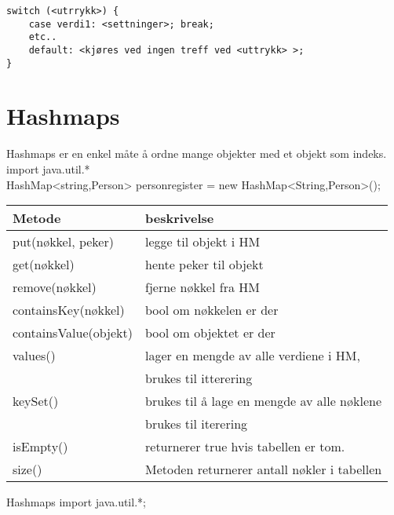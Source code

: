 \documentclass[11pt]{article}
\begin{document}
\begin{verbatim}
switch (<utrrykk>) {
    case verdi1: <settninger>; break;
    etc..
    default: <kjøres ved ingen treff ved <uttrykk> >;
}
\end{verbatim}
\section{Hashmaps}
\label{sec-6}


  Hashmaps er en enkel måte å ordne mange objekter med et objekt som
  indeks.\\
  import java.util.*\\
  HashMap<string,Person> personregister = new HashMap<String,Person>();\\
  

\begin{center}
\begin{tabular}{ll}
\hline
 Metode                 &  beskrivelse                                  \\
\hline
 put(nøkkel, peker)     &  legge til objekt i HM                        \\
\hline
 get(nøkkel)            &  hente peker til objekt                       \\
\hline
 remove(nøkkel)         &  fjerne nøkkel fra HM                         \\
\hline
 containsKey(nøkkel)    &  bool om nøkkelen er der                      \\
\hline
 containsValue(objekt)  &  bool om objektet er der                      \\
\hline
 values()               &  lager en mengde av alle verdiene i HM,       \\
                        &  brukes til itterering                        \\
\hline
 keySet()               &  brukes til å lage en mengde av alle nøklene  \\
                        &  brukes til iterering                         \\
\hline
 isEmpty()              &  returnerer true hvis tabellen er tom.        \\
\hline
 size()                 &  Metoden returnerer antall nøkler i tabellen  \\
\hline
\end{tabular}
\end{center}



Hashmaps
import java.util.*;
\end{document}
